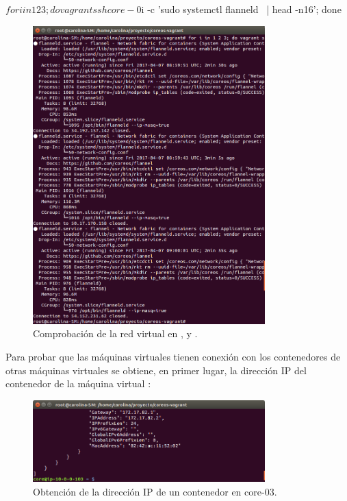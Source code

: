 \begin{code}
$ for i in 1 2 3; do vagrant ssh core-0$i -c 'sudo systemctl flanneld \
  | head -n16'; done
\end{code}

\begin{figure}[H]
\centering
\includegraphics[width=0.8\textwidth]{images/figures/flanneld-aws-3.png}
\caption{Comprobación de la red virtual en \kode{core-01}, \kode{core-02} y .\label{fig:figure_placement_example}}
\end{figure}

Para probar que las máquinas virtuales tienen conexión con los contenedores de otras máquinas virtuales se obtiene, en primer lugar, la dirección IP del contenedor  de la máquina virtual :


\begin{figure}[H]
\centering
\includegraphics[width=0.8\textwidth]{images/figures/docker-inspect-3.png}
\caption{Obtención de la dirección IP de un contenedor en core-03.\label{fig:figure_placement_example}}
\end{figure}

